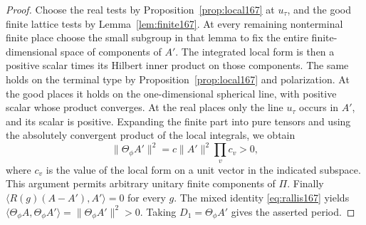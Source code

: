 \documentclass[a4paper,11pt]{article}
\theoremstyle{definition}
\theoremstyle{remark}
\numberwithin{equation}{section}
\begin{document}
\begin{proof}
Choose the real tests by Proposition~\ref{prop:local167}
at \(u_\tau\), and the good finite lattice tests by
Lemma~\ref{lem:finite167}. At every remaining nonterminal
finite place choose the small subgroup in that lemma to
fix the entire finite-dimensional space of components of
\(A'\). The integrated local form is then a positive scalar
times its Hilbert inner product on those components. The
same holds on the terminal type by Proposition~\ref{prop:local167}
and polarization. At the good places it holds on the
one-dimensional spherical line, with positive scalar whose
product converges. At the real places only the line \(u_\tau\)
occurs in \(A'\), and its scalar is positive. Expanding the
finite part into pure tensors and using the absolutely
convergent product of the local integrals, we obtain
\[
      \|\Theta_\phi A'\|^2
          =c\|A'\|^2\prod_v c_v>0 ,
\]
where \(c_v\) is the value of the local form on a unit vector
in the indicated subspace. This argument permits arbitrary
unitary finite components of \(\Pi\). Finally
\(\langle R(g)(A-A'),A'\rangle=0\) for every \(g\).
The mixed identity \eqref{eq:rallis167} yields
\(\langle\Theta_\phi A,\Theta_\phi A'\rangle
=\|\Theta_\phi A'\|^2>0\).
Taking \(D_1=\Theta_\phi A'\) gives the asserted period.
\end{proof}
\end{document}
